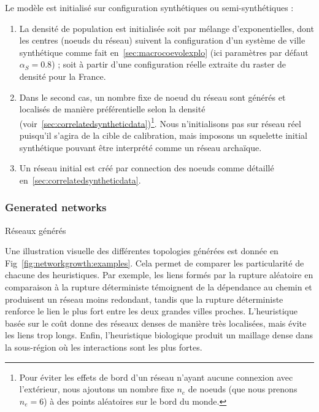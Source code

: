 Le modèle est initialisé sur configuration synthétiques ou semi-synthétiques :
\begin{enumerate}
	\item La densité de population est initialisée soit par mélange d'exponentielles, dont les centres (noeuds du réseau) suivent la configuration d'un système de ville synthétique comme fait en~\ref{sec:macrocoevolexplo} (ici paramètres par défaut $\alpha_S = 0.8$) ; soit à partir d'une configuration réelle extraite du raster de densité pour la France. 
	\item Dans le second cas, un nombre fixe de noeud du réseau sont générés et localisés de manière préférentielle selon la densité (voir~\ref{sec:correlatedsyntheticdata})\footnote{Pour éviter les effets de bord d'un réseau n'ayant aucune connexion avec l'extérieur, nous ajoutons un nombre fixe $n_e$ de noeuds (que nous prenons $n_e = 6$) à des points aléatoires sur le bord du monde.}. Nous n'initialisons pas sur réseau réel puisqu'il s'agira de la cible de calibration, mais imposons un squelette initial synthétique pouvant être interprété comme un réseau archaïque.
	\item Un réseau initial est créé par connection des noeuds comme détaillé en~\ref{sec:correlatedsyntheticdata}.
\end{enumerate}


\subsubsection{Generated networks}{Réseaux générés}

Une illustration visuelle des différentes topologies générées est donnée en Fig~\ref{fig:networkgrowth:examples}. Cela permet de comparer les particularité de chacune des heuristiques. Par exemple, les liens formés par la rupture aléatoire en comparaison à la rupture déterministe témoignent de la dépendance au chemin et produisent un réseau moins redondant, tandis que la rupture déterministe renforce le lien le plus fort entre les deux grandes villes proches. L'heuristique basée sur le coût donne des réseaux denses de manière très localisées, mais évite les liens trop longs. Enfin, l'heuristique biologique produit un maillage dense dans la sous-région où les interactions sont les plus fortes.



